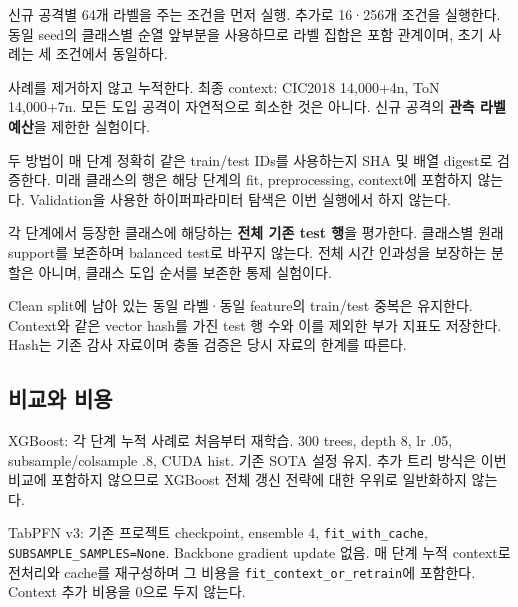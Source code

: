 \par\noindent \textbullet\enspace 신규 공격별 64개 라벨을 주는 조건을 먼저 실행. 추가로 16·256개 조건을 실행한다. 동일 seed의 클래스별 순열 앞부분을 사용하므로 라벨 집합은 포함 관계이며, 초기 사례는 세 조건에서 동일하다.


\par\noindent \textbullet\enspace 사례를 제거하지 않고 누적한다. 최종 context: CIC2018 14,000+\allowbreak{}4n, ToN 14,000+\allowbreak{}7n. 모든 도입 공격이 자연적으로 희소한 것은 아니다. 신규 공격의 \textbf{관측 라벨 예산}을 제한한 실험이다.


\par\noindent \textbullet\enspace 두 방법이 매 단계 정확히 같은 train/\allowbreak{}test IDs를 사용하는지 SHA 및 배열 digest로 검증한다. 미래 클래스의 행은 해당 단계의 fit, preprocessing, context에 포함하지 않는다. Validation을 사용한 하이퍼파라미터 탐색은 이번 실행에서 하지 않는다.


\par\noindent \textbullet\enspace 각 단계에서 등장한 클래스에 해당하는 \textbf{전체 기존 test 행}을 평가한다. 클래스별 원래 support를 보존하며 balanced test로 바꾸지 않는다. 전체 시간 인과성을 보장하는 분할은 아니며, 클래스 도입 순서를 보존한 통제 실험이다.


\par\noindent \textbullet\enspace Clean split에 남아 있는 동일 라벨·동일 feature의 train/\allowbreak{}test 중복은 유지한다. Context와 같은 vector hash를 가진 test 행 수와 이를 제외한 부가 지표도 저장한다. Hash는 기존 감사 자료이며 충돌 검증은 당시 자료의 한계를 따른다.


\subsection{비교와 비용}
\par\noindent \textbullet\enspace XGBoost: 각 단계 누적 사례로 처음부터 재학습. 300 trees, depth 8, lr .05, subsample/\allowbreak{}colsample .8, CUDA hist. 기존 SOTA 설정 유지. 추가 트리 방식은 이번 비교에 포함하지 않으므로 XGBoost 전체 갱신 전략에 대한 우위로 일반화하지 않는다.


\par\noindent \textbullet\enspace TabPFN v3: 기존 프로젝트 checkpoint, ensemble 4, \texttt{fit\_\allowbreak{}\allowbreak{}with\allowbreak{}\_\allowbreak{}\allowbreak{}cache}, \texttt{SUBSAMPL\allowbreak{}E\_\allowbreak{}\allowbreak{}SAMPLE\allowbreak{}S=\allowbreak{}\allowbreak{}None}. Backbone gradient update 없음. 매 단계 누적 context로 전처리와 cache를 재구성하며 그 비용을 \texttt{fit\_\allowbreak{}\allowbreak{}cont\allowbreak{}ext\_\allowbreak{}\allowbreak{}or\_\allowbreak{}\allowbreak{}r\allowbreak{}etrain}에 포함한다. Context 추가 비용을 0으로 두지 않는다.


